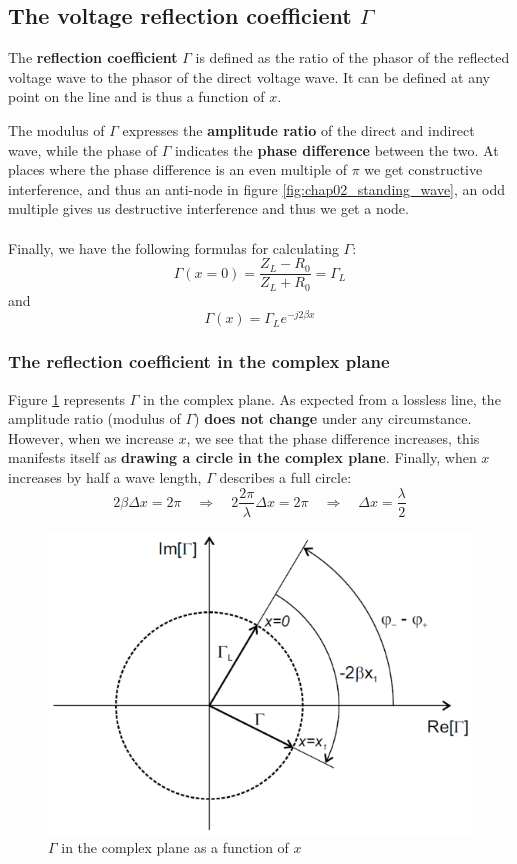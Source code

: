 \documentclass[../transmission.tex]{subfiles}
\begin{document}
		\subsection{The voltage reflection coefficient $\Gamma$}
			The \textbf{reflection coefficient} $\Gamma$ is defined as the ratio of the phasor of the reflected voltage wave to the phasor of the direct voltage wave. It can be defined at any point on the line and is thus a function of $x$.
			
			The modulus of $\Gamma$ expresses the \textbf{amplitude ratio} of the direct and indirect wave, while the phase of $\Gamma$ indicates the \textbf{phase difference} between the two. At places where the phase difference is an even multiple of $\pi$ we get constructive interference, and thus an anti-node in figure \ref{fig:chap02_standing_wave}, an odd multiple gives us destructive interference and thus we get a node. \\
			\\
			Finally, we have the following formulas for calculating $\Gamma$:
			\begin{equation}
				\Gamma(x=0) = \frac{Z_L-R_0}{Z_L+R_0} = \Gamma_L
			\end{equation}
			and
			\begin{equation}
				\label{eq:refl_coeff_position}
				\Gamma(x)=\Gamma_Le^{-j2\beta x}
			\end{equation}
			
			\subsubsection{The reflection coefficient in the complex plane}
				\label{sec:refl_coeff_complex_plane}
				Figure \ref{fig:chap02_gamma_complex} represents $\Gamma$ in the complex plane. As expected from a lossless line, the amplitude ratio (modulus of $\Gamma$) \textbf{does not change} under any circumstance. However, when we increase $x$, we see that the phase difference increases, this manifests itself as \textbf{drawing a circle in the complex plane}. Finally, when $x$ increases by half a wave length, $\Gamma$ describes a full circle:
				\begin{equation}
					2\beta\Delta x= 2\pi \quad\Rightarrow\quad 2\frac{2\pi}{\lambda}\Delta x = 2\pi \quad\Rightarrow\quad \Delta x = \frac{\lambda}{2}
				\end{equation}
				\begin{figure}[h]
					\centering
					\includegraphics[width=0.5\linewidth]{../assets/chap02_gamma_complex.png}
					\caption{$\Gamma$ in the complex plane as a function of $x$}
					\label{fig:chap02_gamma_complex}
				\end{figure}
				
\end{document}
